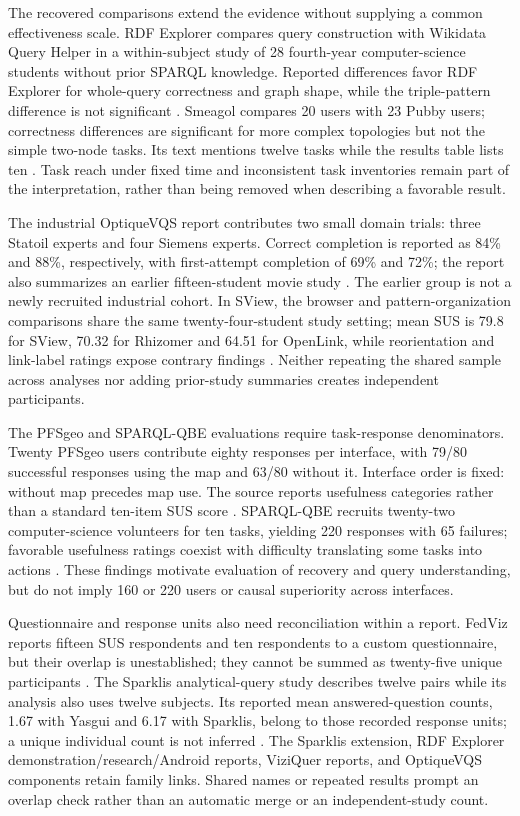 \documentclass[manuscript,review,screen]{acmart}
\begin{document}
The recovered comparisons extend the evidence without supplying a common effectiveness scale. RDF Explorer compares query construction with Wikidata Query Helper in a within-subject study of 28 fourth-year computer-science students without prior SPARQL knowledge. Reported differences favor RDF Explorer for whole-query correctness and graph shape, while the triple-pattern difference is not significant \citep{V3-02210}. Smeagol compares 20 users with 23 Pubby users; correctness differences are significant for more complex topologies but not the simple two-node tasks. Its text mentions twelve tasks while the results table lists ten \citep{V3-02525}. Task reach under fixed time and inconsistent task inventories remain part of the interpretation, rather than being removed when describing a favorable result.

The industrial OptiqueVQS report contributes two small domain trials: three Statoil experts and four Siemens experts. Correct completion is reported as 84\% and 88\%, respectively, with first-attempt completion of 69\% and 72\%; the report also summarizes an earlier fifteen-student movie study \citep{V3-02014}. The earlier group is not a newly recruited industrial cohort. In SView, the browser and pattern-organization comparisons share the same twenty-four-student study setting; mean SUS is 79.8 for SView, 70.32 for Rhizomer and 64.51 for OpenLink, while reorientation and link-label ratings expose contrary findings \citep{V3-01744}. Neither repeating the shared sample across analyses nor adding prior-study summaries creates independent participants.

The PFSgeo and SPARQL-QBE evaluations require task-response denominators. Twenty PFSgeo users contribute eighty responses per interface, with 79/80 successful responses using the map and 63/80 without it. Interface order is fixed: without map precedes map use. The source reports usefulness categories rather than a standard ten-item SUS score \citep{V3-02091}. SPARQL-QBE recruits twenty-two computer-science volunteers for ten tasks, yielding 220 responses with 65 failures; favorable usefulness ratings coexist with difficulty translating some tasks into actions \citep{V3-02185}. These findings motivate evaluation of recovery and query understanding, but do not imply 160 or 220 users or causal superiority across interfaces.

Questionnaire and response units also need reconciliation within a report. FedViz reports fifteen SUS respondents and ten respondents to a custom questionnaire, but their overlap is unestablished; they cannot be summed as twenty-five unique participants \citep{V3-01125}. The Sparklis analytical-query study describes twelve pairs while its analysis also uses twelve subjects. Its reported mean answered-question counts, 1.67 with Yasgui and 6.17 with Sparklis, belong to those recorded response units; a unique individual count is not inferred \citep{V3-00369}. The Sparklis extension, RDF Explorer demonstration/research/Android reports, ViziQuer reports, and OptiqueVQS components retain family links. Shared names or repeated results prompt an overlap check rather than an automatic merge or an independent-study count.
\end{document}
